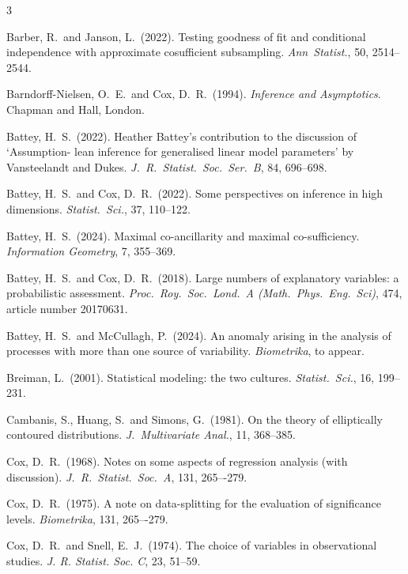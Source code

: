 \documentclass[10pt, reqno]{amsart}
\numberwithin{equation}{section}
\begin{document}
\begin{thebibliography}{3}
	
	
	Barber, R.~and Janson, L.~(2022).
	Testing goodness of fit and conditional independence with approximate cosufficient subsampling.
	\textit{Ann~Statist.}, 50, 2514--2544.	
	
	
	Barndorff-Nielsen, O.~E.~and Cox, D.~R.~(1994). \emph{Inference and Asymptotics}. Chapman and Hall, London. 
	
	Battey, H.~S.~(2022). Heather Battey's contribution to the discussion of  `Assumption- lean inference for generalised  linear model parameters' by Vansteelandt and  Dukes. \emph{J.~R.~Statist.~Soc.~Ser.~B}, 84, 696--698.
	
	Battey, H.~S.~and Cox, D.~R.~(2022). Some perspectives on inference in high dimensions. \emph{Statist.~Sci.}, 37, 110--122.
	
	Battey, H.~S.~(2024). Maximal co-ancillarity and maximal co-sufficiency. \emph{Information Geometry}, 7, 355--369.
	
	Battey, H.~S.~and Cox, D.~R.~(2018). Large numbers of explanatory variables: a probabilistic assessment. \emph{Proc.~Roy.~Soc.~Lond.~A (Math.~Phys.~Eng.~Sci)}, 474, article number 20170631.
	
	Battey, H.~S.~and McCullagh, P.~(2024). An anomaly arising in the analysis of processes with more than one source of variability. \emph{Biometrika}, to appear.
	
	Breiman, L.~(2001). Statistical modeling: the two cultures. \emph{Statist.~Sci.}, 16, 199--231.
	
	Cambanis, S., Huang, S.~and Simons, G.~(1981). On the theory of elliptically contoured distributions. \emph{J.~Multivariate Anal.}, 11, 368--385.
	
	Cox, D.~R.~(1968).  Notes on some aspects of regression analysis (with discussion). \emph{J.~R.~Statist.~Soc.~A}, 131, 265–-279.
	
	Cox, D.~R.~(1975). A note on data-splitting for the evaluation of significance levels. \emph{Biometrika}, 131, 265–-279.
	
	Cox, D.~R.~and Snell, E.~J.~(1974). The choice of variables in observational studies. \emph{J. R. Statist. Soc. C}, 23, 51--59. 
	

\end{thebibliography}
\end{document}
